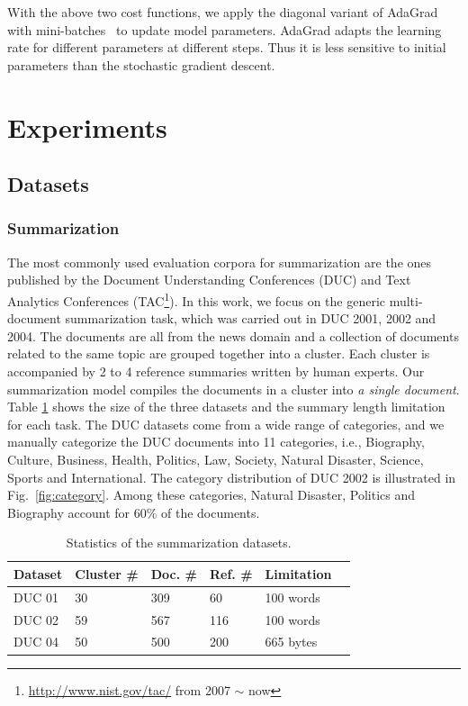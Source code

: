 \documentclass[letterpaper]{article}
\begin{document}
With the above two cost functions, we apply the diagonal variant of AdaGrad with mini-batches~\cite{duchi2011adaptive} to update model parameters.
AdaGrad adapts the learning rate for different parameters at different steps.
Thus it is less sensitive to initial parameters than the stochastic gradient descent.


\section{Experiments}
\subsection{Datasets} \label{SC:dataset}
\subsubsection{Summarization}
The most commonly used evaluation corpora for summarization are the ones published by the Document Understanding Conferences (DUC) and Text Analytics Conferences (TAC\footnote{\url{http://www.nist.gov/tac/} from 2007 $\sim$ now}).
In this work, we focus on the generic multi-document summarization task, which was carried out in DUC 2001, 2002 and 2004.
The documents are all from the news domain and a collection of documents related to the same topic are grouped together into a cluster.
Each cluster is accompanied by 2 to 4 reference summaries written by human experts.
Our summarization model compiles the documents in a cluster into \textit{a single document}.
Table \ref{TB:dataset} shows the size of the three datasets and the summary length limitation for each task.
The DUC datasets come from a wide range of categories, and we manually categorize the DUC documents into 11 categories, i.e., Biography, Culture, Business, Health, Politics, Law, Society, Natural Disaster, Science, Sports and International.
The category distribution of DUC 2002 is illustrated in Fig.~\ref{fig:category}.
Among these categories, Natural Disaster, Politics and Biography account for 60\% of the documents.



\begin{table}[ht]
\centering
\small
\begin{tabular}{l|lllll}
\hline
Dataset & Cluster \# & Doc. \#  & Ref. \#  &Limitation\\ \hline
DUC 01  & 30         & 309                & 60    & 100 words       \\ \hline
DUC 02  & 59         & 567                 & 116   &100 words       \\ \hline
DUC 04  & 50         & 500                & 200    &665 bytes      \\ \hline
\end{tabular}
\caption{Statistics of the summarization datasets.}
\label{TB:dataset}
\end{table}
\end{document}
